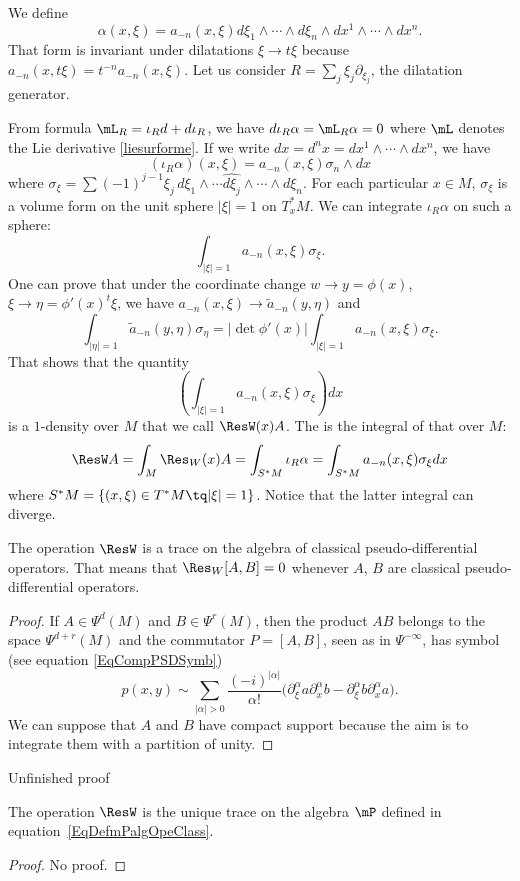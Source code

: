 We define
\[
	\alpha(x,\xi)=a_{-n}(x,\xi)d\xi_1\wedge\cdots\wedge d\xi_n\wedge dx^1\wedge\cdots\wedge dx^n.
\]
That form is invariant under dilatations $\xi\to t\xi$ because $a_{-n}(x,t\xi)=t^{-n}a_{-n}(x,\xi)$. Let us consider $R=\sum_j \xi_j\partial_{\xi_j}$, the dilatation generator.

From formula $\mL_R=\iota_Rd+d\iota_R$, we have $d\iota_R\alpha=\mL_R\alpha=0$ where $\mL$ denotes the Lie derivative \eqref{liesurforme}. If we write $dx=d^nx=dx^1\wedge\cdots\wedge dx^n$, we have
\[
	(\iota_R\alpha)(x,\xi)=a_{-n}(x,\xi)\sigma_n\wedge dx
\]
where $\sigma_{\xi}=\sum (-1)^{j-1}\xi_j\,d\xi_1\wedge\cdots\widehat{d\xi_j}\wedge\cdots\wedge d\xi_n$. For each particular $x\in M$, $\sigma_{\xi}$ is a volume form on the unit sphere $| \xi |=1$ on $T^*_xM$. We can integrate $\iota_R\alpha$ on such a sphere:
\[
	\int_{| \xi |=1}a_{-n}(x,\xi)\sigma_{\xi}.
\]
One can prove that under the coordinate change $w\to y=\phi(x)$, $\xi\to\eta=\phi'(x)^t\xi$, we have $a_{-n}(x,\xi)\to \tilde a_{-n}(y,\eta)$ and
\[
	\int_{| \eta |=1}\tilde a_{-n}(y,\eta)\sigma_{\eta}=| \det\phi'(x) |\int_{| \xi |=1}a_{-n}(x,\xi)\sigma_{\xi}.
\]
That shows that the quantity
\begin{equation}
	\left( \int_{| \xi |=1}a_{-n}(x,\xi)\sigma_{\xi} \right)dx
\end{equation}
is a $1$-density over $M$ that we call $\ResW(x)A$. The  is the integral of that over $M$:
\begin{equation}
	\ResW A=\int_M\Res_W(x)A=\int_{S^*M}\iota_R\alpha=\int_{S^*M}a_{-n}(x,\xi)\sigma_{\xi}dx
\end{equation}
where $S^*M=\{ (x,\xi)\in T^*M\tq | \xi |=1 \}$. Notice that the latter integral can diverge.

\begin{proposition}
	The operation $\ResW$ is a trace on the algebra of classical pseudo-differential operators. That means that $\Res_W[A,B]=0$ whenever $A$, $B$ are classical pseudo-differential operators.
\end{proposition}

\begin{proof}
	If $A\in\Psi^d(M)$ and $B\in\Psi^r(M)$, then the product $AB$ belongs to the space $\Psi^{d+r}(M)$ and the commutator $P=[A,B]$,  seen as in $\Psi^{-\infty}$, has symbol (see equation \eqref{EqCompPSDSymb})
	\[
		p(x,y)\sim\sum_{| \alpha |>0}\frac{ (-i)^{| \alpha |} }{ \alpha! }\big( \partial^{\alpha}_{\xi}a\partial_x^{\alpha}b-\partial^{\alpha}_{\xi}b\partial_x^{\alpha}a \big).
	\]
	We can suppose that $A$ and $B$ have compact support because the aim is to integrate them with a partition of unity.
\end{proof}

\begin{probleme}
	Unfinished proof
\end{probleme}

\begin{proposition}
	The operation $\ResW$ is the unique trace on the algebra $\mP$ defined in equation~\ref{EqDefmPalgOpeClass}.
\end{proposition}
\begin{proof}
	No proof.
\end{proof}

